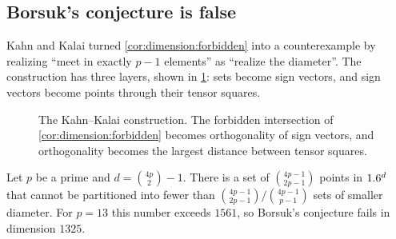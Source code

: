 \begin{refsection}
\subsection{Borsuk's conjecture is false}\label{sec:dimension:kk}

Kahn and Kalai turned \cref{cor:dimension:forbidden} into a counterexample by realizing ``meet in exactly $p-1$ elements'' as ``realize the diameter''. The construction has three layers, shown in \cref{fig:dimension:kk}: sets become sign vectors, and sign vectors become points through their tensor squares.

\begin{figure}[t]
\centering
{}
\caption{The Kahn--Kalai construction. The forbidden intersection of \cref{cor:dimension:forbidden} becomes orthogonality of sign vectors, and orthogonality becomes the largest distance between tensor squares.}\label{fig:dimension:kk}
\end{figure}

\begin{theorem}\label{thm:dimension:kahnkalai}
Let $p$ be a prime and $d=\binom{4p}{2}-1$. There is a set of $\binom{4p-1}{2p-1}$ points in $1.6^d$ that cannot be partitioned into fewer than $\binom{4p-1}{2p-1}\big/\binom{4p-1}{p-1}$ sets of smaller diameter. For $p=13$ this number exceeds $1561$, so Borsuk's conjecture fails in dimension $1325$.
\end{theorem}


\end{refsection}
